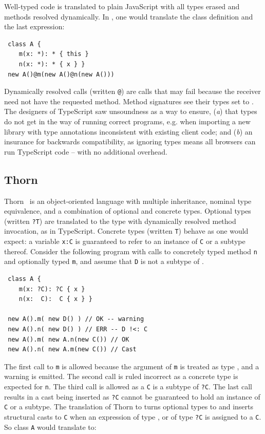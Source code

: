 \documentclass[a4paper,USenglish]{tex/lipics-v2016}
\newcommand{\code}[1]{{\tt #1}\xspace}
\begin{document}
\noindent
Well-typed code is translated to plain JavaScript with all types erased and
methods resolved dynamically. In \kafka, one would translate the class
definition and the last expression:

\begin{lstlisting}
 class A { 
    m(x: *): * { this }
    n(x: *): * { x } }
 new A()@m(new A()@n(new A()))    
\end{lstlisting}

\noindent Dynamically resolved calls (written \code @) are calls that may fail
because the receiver need not have the requested method. Method signatures see
their types set to \any.  The designers of TypeScript saw unsoundness as a way
to ensure, ({\em a}) that types do not get in the way of running correct
programs, e.g. when importing a new library with type annotations inconsistent
with existing client code; and ({\em b}) an insurance for backwards
compatibility, as ignoring types means all browsers can run TypeScript code --
with no additional overhead.

\subsection{Thorn}

Thorn~\cite{oopsla09} is an object-oriented language with multiple inheritance,
nominal type equivalence, and a combination of optional and concrete types.
Optional types (written \code{?T}) are translated to the \any type with
dynamically resolved method invocation, as in TypeScript. Concrete types
(written \code{T}) behave as one would expect: a variable \code{x:C} is
guaranteed to refer to an instance of \code C or a subtype thereof. Consider the
following program with calls to concretely typed method \code n and optionally
typed \code m, and assume that \code D is not a subtype of \C.

\begin{lstlisting}
 class A {
    m(x: ?C): ?C { x }
    n(x:  C):  C { x } }

 new A().m( new D() ) // OK -- warning
 new A().n( new D() ) // ERR -- D !<: C
 new A().m( new A.n(new C()) // OK
 new A().n( new A.m(new C()) // Cast
\end{lstlisting}

\noindent The first call to \code m is allowed because the argument of \code m
is treated as type \any, and a warning is emitted. The second call is ruled
incorrect as a concrete type is expected for \code n. The third call is allowed
as a \code C is a subtype of \code{?C}. The last call results in a cast being
inserted as \code{?C} cannot be guaranteed to hold an instance of \code{C} or a
subtype.  The translation of Thorn to \kafka turns optional types to \any and
inserts structural casts to \code{C} when an expression of type \any, or of type
\code{?C} is assigned to a \code{C}. So class \code A would translate to:
\end{document}
